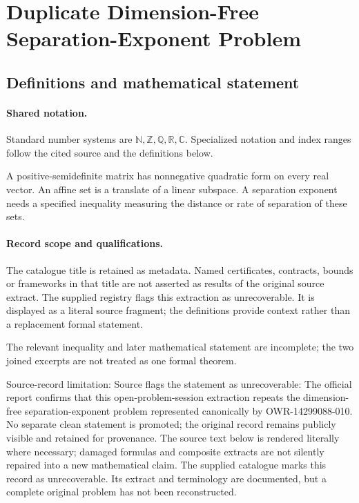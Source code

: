 \documentclass[11pt]{article}
\begin{document}
\section{Duplicate Dimension-Free Separation-Exponent Problem}\label{statement}

\subsection{Definitions and mathematical statement}

\paragraph{Shared notation.}Standard number systems are $\mathbb N,\mathbb Z,\mathbb Q,\mathbb R,\mathbb C$. Specialized notation and index ranges follow the cited source and the definitions below.


A positive-semidefinite matrix has nonnegative quadratic form on every real vector. An affine set is a translate of a linear subspace. A separation exponent needs a specified inequality measuring the distance or rate of separation of these sets.
\paragraph{Record scope and qualifications.}
The catalogue title is retained as metadata. Named certificates, contracts, bounds or frameworks in that title are not asserted as results of the original source extract.
The supplied registry flags this extraction as unrecoverable. It is displayed as a literal source fragment; the definitions provide context rather than a replacement formal statement.

The relevant inequality and later mathematical statement are incomplete; the two joined excerpts are not treated as one formal theorem.

Source-record limitation: Source flags the statement as unrecoverable: The official report confirms that this open-problem-session extraction repeats the dimension-free separation-exponent problem represented canonically by OWR-14299088-010. No separate clean statement is promoted; the original record remains publicly visible and retained for provenance.
The source text below is rendered literally where necessary; damaged formulas and composite extracts are not silently repaired into a new mathematical claim.
The supplied catalogue marks this record as unrecoverable. Its extract and terminology are documented, but a complete original problem has not been reconstructed.
\end{document}
